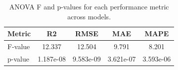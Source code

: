\begin{table}
\caption{ANOVA F and p-values for each performance metric across models.}
\label{tab:anova_metrics}
\begin{tabular}{lcccc}
\toprule
Metric & R2 & RMSE & MAE & MAPE \\
\midrule
F-value & 12.337 & 12.504 & 9.791 & 8.201 \\
p-value & 1.187e-08 & 9.583e-09 & 3.621e-07 & 3.593e-06 \\
\bottomrule
\end{tabular}
\end{table}
